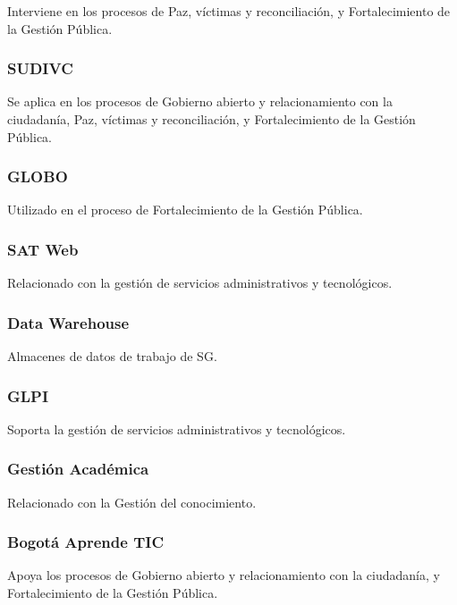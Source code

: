 \documentclass[
	a4paper, %
	12pt, %
]{include/CSSullivanBusinessReport}
\begin{document}
Interviene en los procesos de Paz, víctimas y reconciliación, y
Fortalecimiento de la Gestión Pública.

\subsubsection{SUDIVC}\label{sec:sudivc}

Se aplica en los procesos de Gobierno abierto y relacionamiento con la
ciudadanía, Paz, víctimas y reconciliación, y Fortalecimiento de la
Gestión Pública.

\subsubsection{GLOBO}\label{sec:globo}

Utilizado en el proceso de Fortalecimiento de la Gestión Pública.

\subsubsection{SAT Web}\label{sec:sat-web}

Relacionado con la gestión de servicios administrativos y tecnológicos.

\subsubsection{Data Warehouse}\label{sec:data-warehouse}

Almacenes de datos de trabajo de SG.

\subsubsection{GLPI}\label{sec:glpi}

Soporta la gestión de servicios administrativos y tecnológicos.

\subsubsection{Gestión Académica}\label{sec:gestiuxf3n-acaduxe9mica}

Relacionado con la Gestión del conocimiento.

\subsubsection{Bogotá Aprende TIC}\label{sec:bogotuxe1-aprende-tic}

Apoya los procesos de Gobierno abierto y relacionamiento con la
ciudadanía, y Fortalecimiento de la Gestión Pública.
\end{document}
